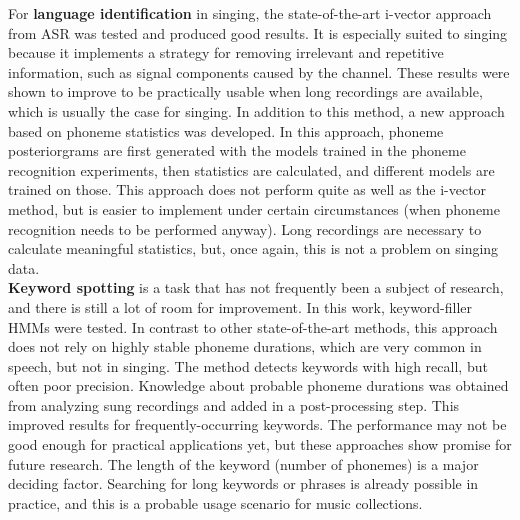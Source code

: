 For \textbf{language identification} in singing, the state-of-the-art i-vector approach from ASR was tested and produced good results. It is especially suited to singing because it implements a strategy for removing irrelevant and repetitive information, such as signal components caused by the channel. These results were shown to improve to be practically usable when long recordings are available, which is usually the case for singing. In addition to this method, a new approach based on phoneme statistics was developed. In this approach, phoneme posteriorgrams are first generated with the models trained in the phoneme recognition experiments, then statistics are calculated, and different models are trained on those. This approach does not perform quite as well as the i-vector method, but is easier to implement under certain circumstances (when phoneme recognition needs to be performed anyway). Long recordings are necessary to calculate meaningful statistics, but, once again, this is not a problem on singing data.\\

\textbf{Keyword spotting} is a task that has not frequently been a subject of research, and there is still a lot of room for improvement. In this work, keyword-filler HMMs were tested. In contrast to other state-of-the-art methods, this approach does not rely on highly stable phoneme durations, which are very common in speech, but not in singing. The method detects keywords with high recall, but often poor precision. Knowledge about probable phoneme durations was obtained from analyzing sung recordings and added in a post-processing step. This improved results for frequently-occurring keywords. The performance may not be good enough for practical applications yet, but these approaches show promise for future research. The length of the keyword (number of phonemes) is a major deciding factor. Searching for long keywords or phrases is already possible in practice, and this is a probable usage scenario for music collections.\\

